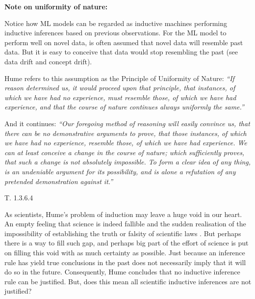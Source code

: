 \documentclass[
  12pt,
]{book}
\begin{document}
\begin{tipbox}

\textbf{Note on uniformity of nature:}

Notice how ML models can be regarded as inductive machines performing inductive inferences based on previous observations. For the ML model to perform well on novel data, is often assumed that novel data will resemble past data. But it is easy to conceive that data would stop resembling the past (see data drift and concept drift).

Hume refers to this assumption as the Principle of Uniformity of Nature: \emph{``If reason determined us, it would proceed upon that principle, that instances, of which we have had no experience, must resemble those, of which we have had experience, and that the course of nature continues always uniformly the same.''}

And it continues: \emph{``Our foregoing method of reasoning will easily convince us, that there can be no demonstrative arguments to prove, that those instances, of which we have had no experience, resemble those, of which we have had experience. We can at least conceive a change in the course of nature; which sufficiently proves, that such a change is not absolutely impossible. To form a clear idea of any thing, is an undeniable argument for its possibility, and is alone a refutation of any pretended demonstration against it.''}

\citep{hume1739treatise} T. 1.3.6.4

\end{tipbox}

As scientists, Hume's problem of induction may leave a huge void in our heart. An empty feeling that science is indeed fallible and the sudden realisation of the impossibility of establishing the truth or falsity of scientific laws \citep{rosenberg2019philosophy}. But perhaps there is a way to fill such gap, and perhaps big part of the effort of science is put on filling this void with as much certainty as possible. Just because an inference rule has yield true conclusions in the past does not necessarily imply that it will do so in the future. Consequently, Hume concludes that no inductive inference rule can be justified. But, does this mean all scientific inductive inferences are not justified?
\end{document}
